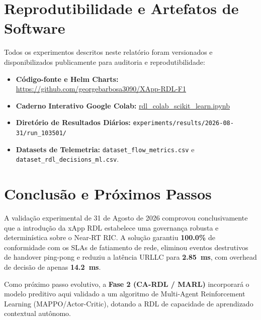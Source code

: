 \documentclass[10pt,journal,compsoc,a4paper]{IEEEtran}
\begin{document}
\section{Reprodutibilidade e Artefatos de Software}
Todos os experimentos descritos neste relatório foram versionados e disponibilizados publicamente para auditoria e reprodutibilidade:
\begin{itemize}
    \item \textbf{Código-fonte e Helm Charts:} \href{https://github.com/georgebarbosa3090/XApp-RDL-F1}{https://github.com/georgebarbosa3090/XApp-RDL-F1}
    \item \textbf{Caderno Interativo Google Colab:} \href{https://colab.research.google.com/github/georgebarbosa3090/XApp-RDL-F1/blob/main/notebooks/rdl_colab_scikit_learn.ipynb}{rdl\_colab\_scikit\_learn.ipynb}
    \item \textbf{Diretório de Resultados Diários:} \texttt{experiments/results/2026-08-31/run\_103501/}
    \item \textbf{Datasets de Telemetria:} \texttt{dataset\_flow\_metrics.csv} e \texttt{dataset\_rdl\_decisions\_ml.csv}.
\end{itemize}

\section{Conclusão e Próximos Passos}
A validação experimental de 31 de Agosto de 2026 comprovou conclusivamente que a introdução da xApp RDL estabelece uma governança robusta e determinística sobre o Near-RT RIC. A solução garantiu \textbf{100.0\%} de conformidade com os SLAs de fatiamento de rede, eliminou eventos destrutivos de handover ping-pong e reduziu a latência URLLC para \textbf{\SI{2.85}{\milli\second}}, com overhead de decisão de apenas \textbf{\SI{14.2}{\milli\second}}. 

Como próximo passo evolutivo, a \textbf{Fase 2 (CA-RDL / MARL)} incorporará o modelo preditivo aqui validado a um algoritmo de Multi-Agent Reinforcement Learning (MAPPO/Actor-Critic), dotando a RDL de capacidade de aprendizado contextual autônomo.
\end{document}
